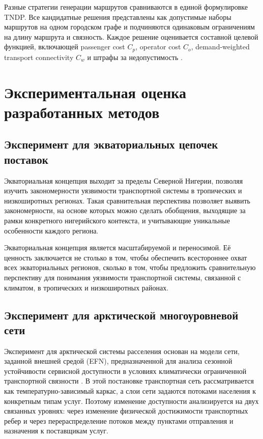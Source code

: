 \documentclass[14pt,a4paper]{extarticle}
\begin{document}
Разные стратегии генерации маршрутов сравниваются в единой формулировке TNDP. Все кандидатные решения представлены как допустимые наборы маршрутов на одном городском графе и подчиняются одинаковым ограничениям на длину маршрута и связность. Каждое решение оценивается составной целевой функцией, включающей passenger cost \(C_p\), operator cost \(C_o\), demand-weighted transport connectivity \(C_w\) и штрафы за недопустимость \cite{morozov2026oneRuleTndp}.

\section*{Экспериментальная оценка разработанных методов}

\subsection*{Эксперимент для экваториальных цепочек поставок}

Экваториальная концепция выходит за пределы Северной Нигерии, позволяя изучить закономерности уязвимости транспортной системы в тропических и низкоширотных регионах. Такая сравнительная перспектива позволяет выявить закономерности, на основе которых можно сделать обобщения, выходящие за рамки конкретного нигерийского контекста, и учитывающие уникальные особенности каждого региона.

Экваториальная концепция является масштабируемой и переносимой. Её ценность заключается не столько в том, чтобы обеспечить всестороннее охват всех экваториальных регионов, сколько в том, чтобы предложить сравнительную перспективу для понимания уязвимости транспортной системы, связанной с климатом, в тропических и низкоширотных районах.

\subsection*{Эксперимент для арктической многоуровневой сети}

Эксперимент для арктической системы расселения основан на модели сети, заданной внешней средой (EFN), предназначенной для анализа сезонной устойчивости сервисной доступности в условиях климатически ограниченной транспортной связности \cite{mineEnvironmentFramedNetworks2026}. В этой постановке транспортная сеть рассматривается как температурно-зависимый каркас, а слои сети задаются потоками населения к конкретным типам услуг. Поэтому изменение доступности анализируется на двух связанных уровнях: через изменение физической достижимости транспортных ребер и через перераспределение потоков между пунктами отправления и назначения к поставщикам услуг.
\end{document}
